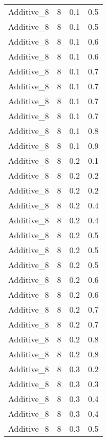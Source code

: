 \documentclass{article}
\begin{document}
\begin{longtable}[H]{lrrr}
 Additive\_8 &       8 &   0.1 &            0.5 \\
 Additive\_8 &       8 &   0.1 &            0.5 \\
 Additive\_8 &       8 &   0.1 &            0.6 \\
 Additive\_8 &       8 &   0.1 &            0.6 \\
 Additive\_8 &       8 &   0.1 &            0.7 \\
 Additive\_8 &       8 &   0.1 &            0.7 \\
 Additive\_8 &       8 &   0.1 &            0.7 \\
 Additive\_8 &       8 &   0.1 &            0.7 \\
 Additive\_8 &       8 &   0.1 &            0.8 \\
 Additive\_8 &       8 &   0.1 &            0.9 \\
 Additive\_8 &       8 &   0.2 &            0.1 \\
 Additive\_8 &       8 &   0.2 &            0.2 \\
 Additive\_8 &       8 &   0.2 &            0.2 \\
 Additive\_8 &       8 &   0.2 &            0.4 \\
 Additive\_8 &       8 &   0.2 &            0.4 \\
 Additive\_8 &       8 &   0.2 &            0.5 \\
 Additive\_8 &       8 &   0.2 &            0.5 \\
 Additive\_8 &       8 &   0.2 &            0.5 \\
 Additive\_8 &       8 &   0.2 &            0.6 \\
 Additive\_8 &       8 &   0.2 &            0.6 \\
 Additive\_8 &       8 &   0.2 &            0.7 \\
 Additive\_8 &       8 &   0.2 &            0.7 \\
 Additive\_8 &       8 &   0.2 &            0.8 \\
 Additive\_8 &       8 &   0.2 &            0.8 \\
 Additive\_8 &       8 &   0.3 &            0.2 \\
 Additive\_8 &       8 &   0.3 &            0.3 \\
 Additive\_8 &       8 &   0.3 &            0.4 \\
 Additive\_8 &       8 &   0.3 &            0.4 \\
 Additive\_8 &       8 &   0.3 &            0.5 \\

\end{longtable}
\end{document}
